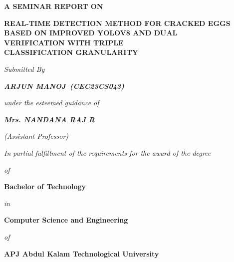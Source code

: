 \documentclass[12pt,a4paper]{report}
\newcommand{\studentname}{ARJUN MANOJ}
\newcommand{\rollno}{CEC23CS043}
\newcommand{\guidename}{Mrs. NANDANA RAJ R}
\begin{document}

\begin{titlepage}
\thispagestyle{empty}
\begin{center}

\vspace*{0.2cm}

{\Large\bfseries A SEMINAR REPORT ON}\par

\vspace{0.45cm}

{\fontsize{15}{21}\selectfont\bfseries
REAL-TIME DETECTION METHOD FOR CRACKED EGGS\\
BASED ON IMPROVED YOLOV8 AND DUAL\\
VERIFICATION WITH TRIPLE\\
CLASSIFICATION GRANULARITY\\}\par

\vspace{0.5cm}

{\large\itshape Submitted By}\par
\vspace{0.15cm}
{\large\bfseries\itshape \studentname\ (\rollno)}\par

\vspace{0.35cm}

{\large\itshape under the esteemed guidance of}\par
\vspace{0.15cm}
{\large\bfseries\itshape \guidename}\par
\vspace{0.1cm}
{\large\itshape (Assistant Professor)}\par

\vspace{0.35cm}

{\large\itshape In partial fulfillment of the requirements for the award of the degree}\par
{\large\itshape of}\par
{\large\bfseries Bachelor of Technology}\par
{\large\itshape in}\par
{\large\bfseries Computer Science and Engineering}\par
{\large\itshape of}\par
{\large\bfseries APJ Abdul Kalam Technological University}\par


\end{center}
\end{titlepage}
\end{document}
